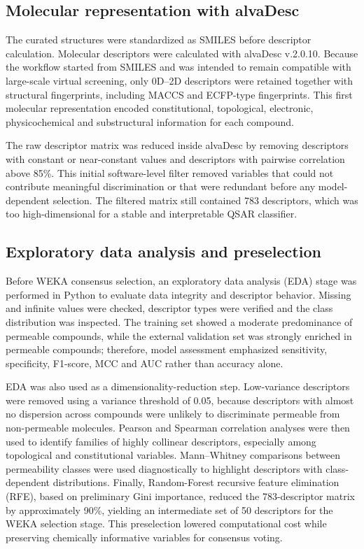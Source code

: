 \documentclass[11pt]{article}
\begin{document}
\subsection{Molecular representation with alvaDesc}
The curated structures were standardized as SMILES before descriptor calculation. Molecular descriptors were calculated with alvaDesc v.2.0.10. Because the workflow started from SMILES and was intended to remain compatible with large-scale virtual screening, only 0D--2D descriptors were retained together with structural fingerprints, including MACCS and ECFP-type fingerprints. This first molecular representation encoded constitutional, topological, electronic, physicochemical and substructural information for each compound.

The raw descriptor matrix was reduced inside alvaDesc by removing descriptors with constant or near-constant values and descriptors with pairwise correlation above 85\%. This initial software-level filter removed variables that could not contribute meaningful discrimination or that were redundant before any model-dependent selection. The filtered matrix still contained 783 descriptors, which was too high-dimensional for a stable and interpretable QSAR classifier.

\subsection{Exploratory data analysis and preselection}
Before WEKA consensus selection, an exploratory data analysis (EDA) stage was performed in Python to evaluate data integrity and descriptor behavior. Missing and infinite values were checked, descriptor types were verified and the class distribution was inspected. The training set showed a moderate predominance of permeable compounds, while the external validation set was strongly enriched in permeable compounds; therefore, model assessment emphasized sensitivity, specificity, F1-score, MCC and AUC rather than accuracy alone.

EDA was also used as a dimensionality-reduction step. Low-variance descriptors were removed using a variance threshold of 0.05, because descriptors with almost no dispersion across compounds were unlikely to discriminate permeable from non-permeable molecules. Pearson and Spearman correlation analyses were then used to identify families of highly collinear descriptors, especially among topological and constitutional variables. Mann--Whitney comparisons between permeability classes were used diagnostically to highlight descriptors with class-dependent distributions. Finally, Random-Forest recursive feature elimination (RFE), based on preliminary Gini importance, reduced the 783-descriptor matrix by approximately 90\%, yielding an intermediate set of 50 descriptors for the WEKA selection stage. This preselection lowered computational cost while preserving chemically informative variables for consensus voting.
\end{document}
